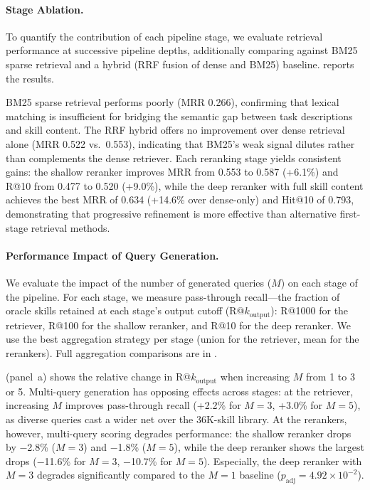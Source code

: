 \documentclass[11pt]{article}
\begin{document}
\paragraph{Stage Ablation.}
To quantify the contribution of each pipeline stage, we evaluate retrieval performance at successive pipeline depths, additionally comparing against BM25 sparse retrieval and a hybrid (RRF fusion of dense and BM25) baseline.
 reports the results.

\begin{table}[t]
  \centering
  \caption{Stage-ablation retrieval metrics on SkillsBench (87 tasks).
  MRR, R@10, P@10, and Hit@10 (fraction of tasks with $\geq$1 oracle skill in top 10) reported.
  The first three rows compare retrieval methods. Subsequent rows add pipeline stages cumulatively.}
  \label{tab:stage_ablation}
  
\end{table}

BM25 sparse retrieval performs poorly (MRR 0.266), confirming that lexical matching is insufficient for bridging the semantic gap between task descriptions and skill content.
The RRF hybrid offers no improvement over dense retrieval alone (MRR 0.522 vs.\ 0.553), indicating that BM25's weak signal dilutes rather than complements the dense retriever.
Each reranking stage yields consistent gains: the shallow reranker improves MRR from 0.553 to 0.587 (+6.1\%) and R@10 from 0.477 to 0.520 (+9.0\%), while the deep reranker with full skill content achieves the best MRR of 0.634 (+14.6\% over dense-only) and Hit@10 of 0.793, demonstrating that progressive refinement is more effective than alternative first-stage retrieval methods.

\paragraph{Performance Impact of Query Generation.}
We evaluate the impact of the number of generated queries ($M$) on each stage of the pipeline.
For each stage, we measure pass-through recall---the fraction of oracle skills retained at each stage's output cutoff (R@$k_\text{output}$): R@1000 for the retriever, R@100 for the shallow reranker, and R@10 for the deep reranker.
We use the best aggregation strategy per stage (union for the retriever, mean for the rerankers). Full aggregation comparisons are in .

 (panel~a) shows the relative change in R@$k_\text{output}$ when increasing $M$ from 1 to 3 or 5.
Multi-query generation has opposing effects across stages: at the retriever, increasing $M$ improves pass-through recall (+2.2\% for $M{=}3$, +3.0\% for $M{=}5$), as diverse queries cast a wider net over the 36K-skill library.
At the rerankers, however, multi-query scoring degrades performance: the shallow reranker drops by $-$2.8\% ($M{=}3$) and $-$1.8\% ($M{=}5$), while the deep reranker shows the largest drops ($-$11.6\% for $M{=}3$, $-$10.7\% for $M{=}5$).
Especially, the deep reranker with $M{=}3$ degrades significantly compared to the $M{=}1$ baseline ($p_{\text{adj}} = 4.92 \times 10^{-2}$).
\end{document}
